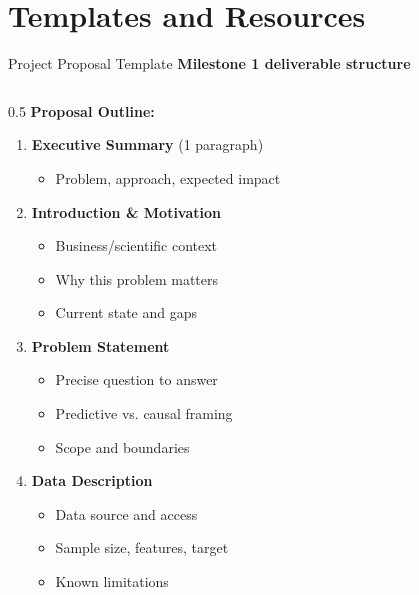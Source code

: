 
\section{Templates and Resources}


\begin{frame}[fragile]{Project Proposal Template}
\textbf{Milestone 1 deliverable structure}

\begin{columns}
\begin{column}{0.5\textwidth}
\textbf{Proposal Outline:}

\begin{enumerate}
\item \textbf{Executive Summary} (1 paragraph)
   \begin{itemize}
   \item Problem, approach, expected impact
   \end{itemize}

\item \textbf{Introduction \& Motivation}
   \begin{itemize}
   \item Business/scientific context
   \item Why this problem matters
   \item Current state and gaps
   \end{itemize}

\item \textbf{Problem Statement}
   \begin{itemize}
   \item Precise question to answer
   \item Predictive vs. causal framing
   \item Scope and boundaries
   \end{itemize}

\item \textbf{Data Description}
   \begin{itemize}
   \item Data source and access
   \item Sample size, features, target
   \item Known limitations
   \end{itemize}


\end{enumerate}
\end{column}
\end{columns}
\end{frame}
